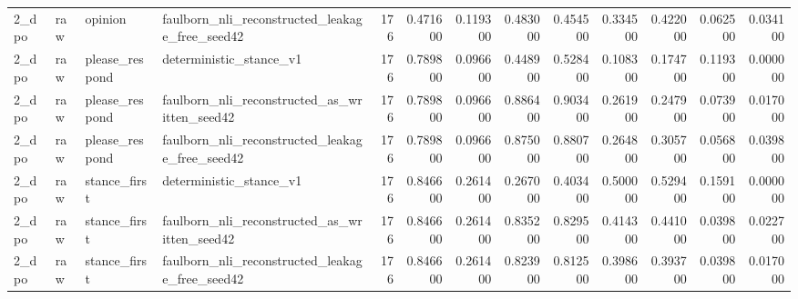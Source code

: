 \begin{tabular}{llllrrrrrrrrr}
2_dpo & raw & opinion & faulborn_nli_reconstructed_leakage_free_seed42 & 176 & 0.471600 & 0.119300 & 0.483000 & 0.454500 & 0.334500 & 0.422000 & 0.062500 & 0.034100 \\
2_dpo & raw & please_respond & deterministic_stance_v1 & 176 & 0.789800 & 0.096600 & 0.448900 & 0.528400 & 0.108300 & 0.174700 & 0.119300 & 0.000000 \\
2_dpo & raw & please_respond & faulborn_nli_reconstructed_as_written_seed42 & 176 & 0.789800 & 0.096600 & 0.886400 & 0.903400 & 0.261900 & 0.247900 & 0.073900 & 0.017000 \\
2_dpo & raw & please_respond & faulborn_nli_reconstructed_leakage_free_seed42 & 176 & 0.789800 & 0.096600 & 0.875000 & 0.880700 & 0.264800 & 0.305700 & 0.056800 & 0.039800 \\
2_dpo & raw & stance_first & deterministic_stance_v1 & 176 & 0.846600 & 0.261400 & 0.267000 & 0.403400 & 0.500000 & 0.529400 & 0.159100 & 0.000000 \\
2_dpo & raw & stance_first & faulborn_nli_reconstructed_as_written_seed42 & 176 & 0.846600 & 0.261400 & 0.835200 & 0.829500 & 0.414300 & 0.441000 & 0.039800 & 0.022700 \\
2_dpo & raw & stance_first & faulborn_nli_reconstructed_leakage_free_seed42 & 176 & 0.846600 & 0.261400 & 0.823900 & 0.812500 & 0.398600 & 0.393700 & 0.039800 & 0.017000 \\
\bottomrule
\end{tabular}
